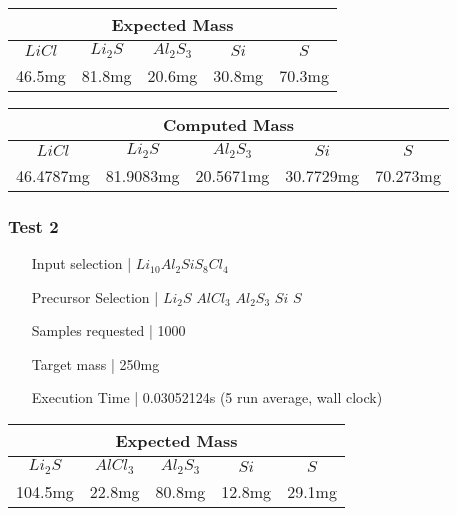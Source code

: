 \begin{table}[h!]
    \centering
    \begin{tabular}{@{}ccccc@{}}
        \toprule
        \multicolumn{5}{c}{Expected Mass}              \\ \midrule
        $LiCl$ & $Li_2S$ & $Al_2S_3$ & $Si$   & $S$    \\
        46.5mg & 81.8mg  & 20.6mg    & 30.8mg & 70.3mg \\ \bottomrule
    \end{tabular}
\end{table}

\begin{table}[h!]
    \centering
    \begin{tabular}{@{}ccccc@{}}
        \toprule
        \multicolumn{5}{c}{Computed Mass}                        \\ \midrule
        $LiCl$    & $Li_2S$   & $Al_2S_3$ & $Si$      & $S$      \\
        46.4787mg & 81.9083mg & 20.5671mg & 30.7729mg & 70.273mg \\ \bottomrule
    \end{tabular}
\end{table}

\subsubsection{Test 2}
\begin{enumerate}[label = {}, leftmargin=\widthof{Precursor Selection |}+\labelsep]
    \item[Input selection |] $Li_{10}Al_2SiS_8Cl_4$
    \item[Precursor Selection |] $Li_2S$ $AlCl_3$ $Al_2S_3$ $Si$ $S$
    \item[Samples requested |] 1000
    \item[Target mass |] 250mg
    \item[Execution Time |] 0.03052124s (5 run average, wall clock)
\end{enumerate}

\begin{table}[h!]
\centering
\begin{tabular}{@{}ccccc@{}}
\toprule
\multicolumn{5}{c}{Expected Mass} \\ \midrule
$Li_2S$ & $AlCl_3$ & $Al_2S_3$ & $Si$ & $S$ \\
104.5mg & 22.8mg & 80.8mg & 12.8mg & 29.1mg \\ \bottomrule
\end{tabular}
\end{table}

